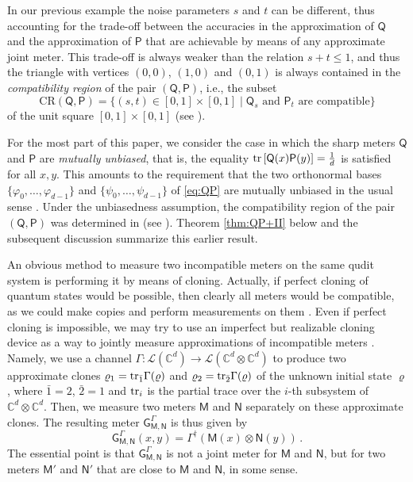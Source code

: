 \documentclass[12pt,reqno]{amsart}
\theoremstyle{definition}
\newcommand{\tr}[1]{{\rm tr}\left[#1\right]} %
\newcommand{\ptr}[2]{{\rm tr}_{#1} #2} %
\newcommand{\Mo}{\mathsf{M}}%
\newcommand{\Qo}{\mathsf{Q}}%
\newcommand{\Po}{\mathsf{P}}%
\newcommand{\No}{\mathsf{N}}%
\newcommand{\Go}{\mathsf{G}}%
\newcommand{\rhoo}{\varrho} %
\newcommand{\phii}{\varphi} %
\newcommand{\Cb}{\mathbb{C}} %
\newcommand{\lc}[1]{\mathcal{L}(\Cb^{#1})} %
\newcommand{\elle}[1]{\mathcal{L}(#1)} %
\newcommand{\CR}[1]{\textrm{CR} #1} %
\begin{document}
In our previous example the noise parameters $s$ and $t$ can be different, thus accounting for the trade-off between the accuracies in the approximation of $\Qo$ and the approximation of $\Po$ that are achievable by means of any approximate joint meter. This trade-off is always weaker than the relation $s+t \leq 1$, and thus the triangle with vertices $(0,0)$, $(1,0)$ and $(0,1)$ is always contained in the \emph{compatibility region} of the pair $(\Qo,\Po)$, i.e., the subset
\begin{equation*}
\CR{(\Qo,\Po)} = \{(s,t) \in [0,1]\times [0,1] \mid \Qo_s \text{ and } \Po_t \text{ are compatible}\}
\end{equation*}
of the unit square $[0,1]\times [0,1]$ (see \cite{BuHeScSt13}).

For the most part of this paper, we consider the case in which the sharp meters $\Qo$ and $\Po$ are \emph{mutually unbiased}, that is, the equality $\tr{\Qo(x)\Po(y)} = \frac{1}{d}$ is satisfied for all $x,y$. This amounts to the requirement that the two orthonormal bases $\{\phii_0,\ldots,\phii_{d-1}\}$ and $\{\psi_0,\ldots,\psi_{d-1}\}$ of \eqref{eq:QP} are mutually unbiased in the usual sense \cite{WoFi89}. Under the unbiasedness assumption, the compatibility region of the pair $(\Qo,\Po)$ was determined in \cite{CaHeTo12,CaHeTo19,CaCaTo19} (see \cite[Eq.~(5) and Fig.~1]{CaCaTo19}). Theorem \ref{thm:QP+II} below and the subsequent discussion summarize this earlier result.

An obvious method to measure two incompatible meters on the same qudit system is performing it by means of cloning. Actually, if perfect cloning of quantum states would be possible, then clearly all meters would be compatible, as we could make copies and perform measurements on them \cite{QI01Werner}. 
Even if perfect cloning is impossible, we may try to use an imperfect but realizable cloning device as a way to jointly measure approximations of incompatible meters \cite{HeScToZi14}.
Namely, we use a channel $\Gamma:\lc{d}\to\elle{\Cb^d\otimes\Cb^d}$ to produce two approximate clones $\rhoo_1 = \ptr{\bar{1}}{\Gamma(\rhoo)$ and $\rhoo_2 = \ptr{\bar{2}}{\Gamma(\rhoo)}$ of the unknown initial state $\rhoo$, where $\bar{1}=2$, $\bar{2}=1$ and ${\rm tr}_{i}$ is the partial trace over the $i$-th subsystem of $\Cb^d\otimes\Cb^d$.} 
Then, we measure two meters $\Mo$ and $\No$ separately on these approximate clones. The resulting meter $\Go^\Gamma_{\Mo,\No}$ is thus given by
\begin{equation} %
\Go^\Gamma_{\Mo,\No}(x,y) = \Gamma^\dag(\Mo(x)\otimes\No(y)) \, .
\end{equation}
The essential point is that $\Go^\Gamma_{\Mo,\No}$ is not a joint meter for $\Mo$ and $\No$, but for two meters $\Mo'$ and $\No'$ that are close to $\Mo$ and $\No$, in some sense.
\end{document}
